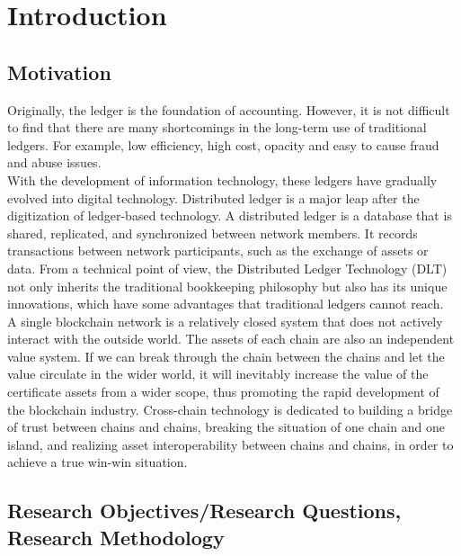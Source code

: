 \chapter{Introduction}
\label{chap:1}




\section{Motivation}

\noindent Originally, the ledger is the foundation of accounting. However, it is not difficult to find that there are many shortcomings in the long-term use of traditional ledgers. For example, low efficiency, high cost, opacity and easy to cause fraud and abuse issues.\\
\noindent With the development of information technology, these ledgers have gradually evolved into digital technology. Distributed ledger is a major leap after the digitization of ledger-based technology. A distributed ledger is a database that is shared, replicated, and synchronized between network members. It records transactions between network participants, such as the exchange of assets or data. From a technical point of view, the Distributed Ledger Technology (DLT) not only inherits the traditional bookkeeping philosophy but also has its unique innovations, which have some advantages that traditional ledgers cannot reach.\\
\noindent A single blockchain network is a relatively closed system that does not actively interact with the outside world. The assets of each chain are also an independent value system. If we can break through the chain between the chains and let the value circulate in the wider world, it will inevitably increase the value of the certificate assets from a wider scope, thus promoting the rapid development of the blockchain industry. Cross-chain technology is dedicated to building a bridge of trust between chains and chains, breaking the situation of one chain and one island, and realizing asset interoperability between chains and chains, in order to achieve a true win-win situation.

\section{Research Objectives/Research Questions, Research Methodology}


